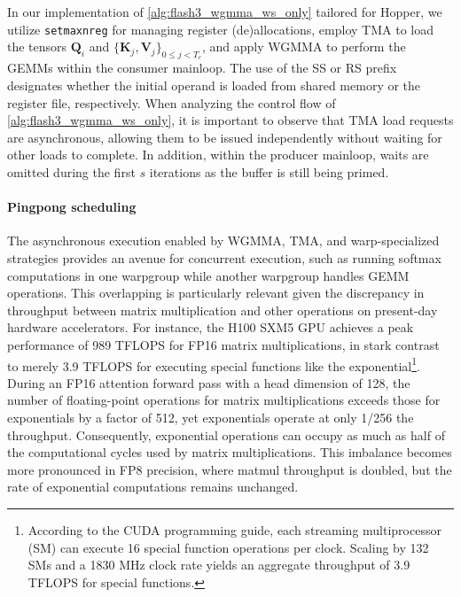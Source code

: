 \begin{enumerate}
In our implementation of \cref{alg:flash3_wgmma_ws_only} tailored for Hopper, we utilize \verb|setmaxnreg| for managing register (de)allocations, employ TMA to load the tensors $\mathbf{Q}_i$ and $\{ \mathbf{K}_j, \mathbf{V}_j \}_{0 \leq j < T_c}$, and apply WGMMA to perform the GEMMs within the consumer mainloop. The use of the SS or RS prefix designates whether the initial operand is loaded from shared memory or the register file, respectively. When analyzing the control flow of \cref{alg:flash3_wgmma_ws_only}, it is important to observe that TMA load requests are asynchronous, allowing them to be issued independently without waiting for other loads to complete. In addition, within the producer mainloop, waits are omitted during the first $s$ iterations as the buffer is still being primed.

\paragraph{Pingpong scheduling} The asynchronous execution enabled by WGMMA, TMA, and warp-specialized strategies provides an avenue for concurrent execution, such as running softmax computations in one warpgroup while another warpgroup handles GEMM operations. This overlapping is particularly relevant given the discrepancy in throughput between matrix multiplication and other operations on present-day hardware accelerators. For instance, the H100 SXM5 GPU achieves a peak performance of 989 TFLOPS for FP16 matrix multiplications, in stark contrast to merely 3.9 TFLOPS for executing special functions like the exponential\footnote{According to the CUDA programming guide, each streaming multiprocessor (SM) can execute 16 special function operations per clock. Scaling by 132 SMs and a 1830 MHz clock rate yields an aggregate throughput of 3.9 TFLOPS for special functions.}. During an FP16 attention forward pass with a head dimension of 128, the number of floating-point operations for matrix multiplications exceeds those for exponentials by a factor of 512, yet exponentials operate at only 1/256 the throughput. Consequently, exponential operations can occupy as much as half of the computational cycles used by matrix multiplications. This imbalance becomes more pronounced in FP8 precision, where matmul throughput is doubled, but the rate of exponential computations remains unchanged.


\end{enumerate}
